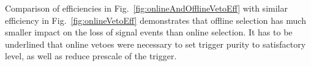 Comparison of efficiencies in Fig.~\ref{fig:onlineAndOfflineVetoEff} with similar efficiency in Fig.~\ref{fig:onlineVetoEff} demonstrates that offline selection has much smaller impact on the loss of signal events than online selection. It has to be underlined that online vetoes were necessary to set trigger purity to satisfactory level, as well as reduce prescale of the trigger.
